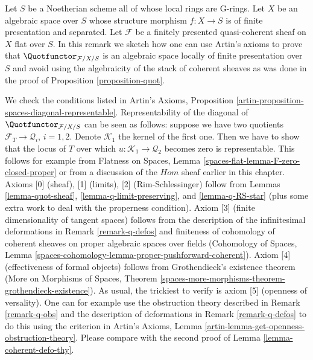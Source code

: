 \begin{remark}
\label{remark-quot-via-artins-axioms}
Let $S$ be a Noetherian scheme all of whose local rings are G-rings.
Let $X$ be an algebraic space over $S$ whose structure morphism
$f : X \to S$ is of finite presentation and separated.
Let $\mathcal{F}$ be a finitely presented quasi-coherent sheaf
on $X$ flat over $S$. In this remark we sketch how one can
use Artin's axioms to prove that $\Quotfunctor_{\mathcal{F}/X/S}$
is an algebraic space locally of finite presentation over $S$
and avoid using the algebraicity of the stack of coherent sheaves
as was done in the proof of Proposition \ref{proposition-quot}.

\medskip\noindent
We check the conditions listed in Artin's Axioms, Proposition
\ref{artin-proposition-spaces-diagonal-representable}.
Representability of the diagonal of $\Quotfunctor_{\mathcal{F}/X/S}$
can be seen as follows: suppose we have two quotients
$\mathcal{F}_T \to \mathcal{Q}_i$, $i = 1, 2$. Denote
$\mathcal{K}_1$ the kernel of the first one. Then we have
to show that the locus of $T$ over which
$u : \mathcal{K}_1 \to \mathcal{Q}_2$ becomes zero is representable.
This follows for example from Flatness on Spaces, Lemma
\ref{spaces-flat-lemma-F-zero-closed-proper}
or from a discussion of the $\mathit{Hom}$ sheaf earlier
in this chapter. Axioms [0] (sheaf), [1] (limits), [2] (Rim-Schlessinger)
follow from Lemmas \ref{lemma-quot-sheaf},
\ref{lemma-q-limit-preserving}, and \ref{lemma-q-RS-star}
(plus some extra work to deal with the properness condition).
Axiom [3] (finite dimensionality of tangent spaces)
follows from the description of the infinitesimal
deformations in Remark \ref{remark-q-defos}
and finiteness of cohomology of coherent sheaves on proper
algebraic spaces over fields (Cohomology of Spaces, Lemma
\ref{spaces-cohomology-lemma-proper-pushforward-coherent}).
Axiom [4] (effectiveness of formal objects)
follows from Grothendieck's existence theorem
(More on Morphisms of Spaces, Theorem
\ref{spaces-more-morphisms-theorem-grothendieck-existence}).
As usual, the trickiest to verify is axiom [5] (openness of versality).
One can for example use the obstruction theory described
in Remark \ref{remark-q-obs} and the description of
deformations in Remark \ref{remark-q-defos}
to do this using the criterion in
Artin's Axioms, Lemma \ref{artin-lemma-get-openness-obstruction-theory}.
Please compare with the second proof of
Lemma \ref{lemma-coherent-defo-thy}.
\end{remark}









